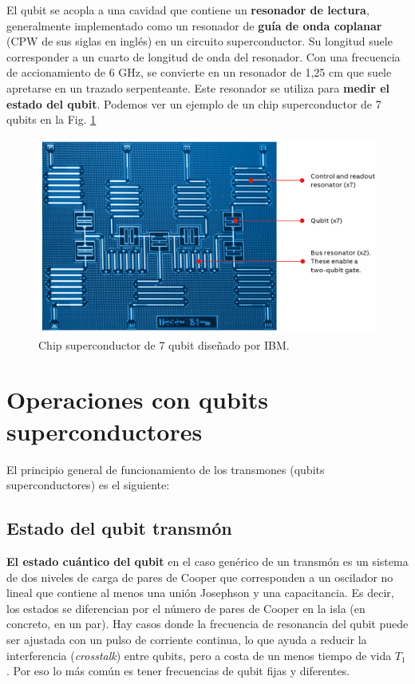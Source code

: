 El qubit se acopla a una cavidad que contiene un \textbf{resonador de lectura}, generalmente implementado como un resonador de \textbf{guía de onda coplanar} (CPW de sus siglas en inglés) en un circuito superconductor. Su longitud suele corresponder a un cuarto de longitud de onda del resonador. Con una frecuencia de accionamiento de 6 GHz, se convierte en un resonador de 1,25 cm que suele apretarse en un trazado serpenteante. Este resonador se utiliza para \textbf{medir el estado del qubit}. Podemos ver un ejemplo de un chip superconductor de 7 qubits en la Fig. \ref{Fig_scq_chip_7_qubits}

	\begin{figure}[t]
	\centering 
	\includegraphics[width=0.7\linewidth]{Figuras/Fig_scq_chip_7_qubits.png}
	\caption{Chip superconductor de 7 qubit diseñado por IBM.}
	\label{Fig_scq_chip_7_qubits}
	\end{figure}










\section{Operaciones con qubits superconductores}

El principio general de funcionamiento de los transmones (qubits superconductores) es el siguiente:


\subsection{Estado del qubit transmón}

\textbf{El estado cuántico del qubit} en el caso genérico de un transmón es un sistema de dos niveles de carga de pares de Cooper que corresponden a un oscilador no lineal que contiene al menos una unión Josephson y una capacitancia. Es decir, los estados se diferencian por el número de pares de Cooper en la isla (en concreto, en un par). Hay casos donde la frecuencia de resonancia del qubit puede ser ajustada con un pulso de corriente continua, lo que ayuda a reducir la interferencia (\textit{crosstalk}) entre qubits, pero a costa de un menos tiempo de vida $T_1$. Por eso lo más común es tener frecuencias de qubit fijas y diferentes.

